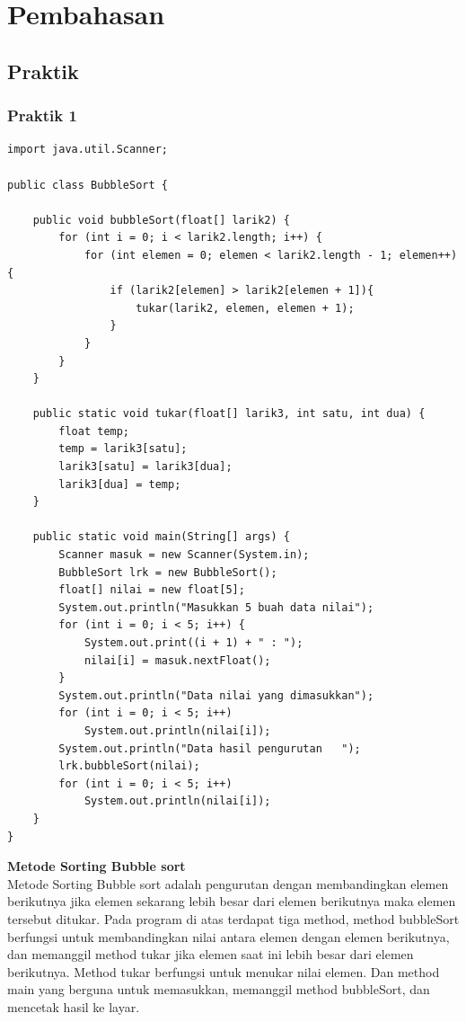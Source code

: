 \documentclass[a4paper,12pt]{article}
\begin{document}
\newpage

\section{Pembahasan}
\subsection{Praktik}
\subsubsection{Praktik 1}
\begin{lstlisting}
import java.util.Scanner;

public class BubbleSort {

    public void bubbleSort(float[] larik2) {
        for (int i = 0; i < larik2.length; i++) {
            for (int elemen = 0; elemen < larik2.length - 1; elemen++) {
                if (larik2[elemen] > larik2[elemen + 1]){
                    tukar(larik2, elemen, elemen + 1);
                }
            }
        }
    }

    public static void tukar(float[] larik3, int satu, int dua) {
        float temp;
        temp = larik3[satu];
        larik3[satu] = larik3[dua];
        larik3[dua] = temp;
    }

    public static void main(String[] args) {
        Scanner masuk = new Scanner(System.in);
        BubbleSort lrk = new BubbleSort();
        float[] nilai = new float[5];
        System.out.println("Masukkan 5 buah data nilai");
        for (int i = 0; i < 5; i++) {
            System.out.print((i + 1) + " : ");
            nilai[i] = masuk.nextFloat();
        }
        System.out.println("Data nilai yang dimasukkan");
        for (int i = 0; i < 5; i++)
            System.out.println(nilai[i]);
        System.out.println("Data hasil pengurutan   ");
        lrk.bubbleSort(nilai);
        for (int i = 0; i < 5; i++)
            System.out.println(nilai[i]);
    }
}
\end{lstlisting}

\textbf{Metode Sorting Bubble sort\\}
Metode Sorting Bubble sort adalah pengurutan dengan membandingkan elemen berikutnya jika elemen sekarang
lebih besar dari elemen berikutnya maka elemen tersebut ditukar. Pada program di atas terdapat tiga method, method
bubbleSort berfungsi untuk membandingkan nilai antara elemen dengan elemen berikutnya, dan memanggil method tukar jika
elemen saat ini lebih besar dari elemen berikutnya. Method tukar berfungsi untuk
menukar nilai elemen. Dan method main yang berguna untuk memasukkan, memanggil method bubbleSort, dan mencetak hasil ke
layar.
\end{document}
